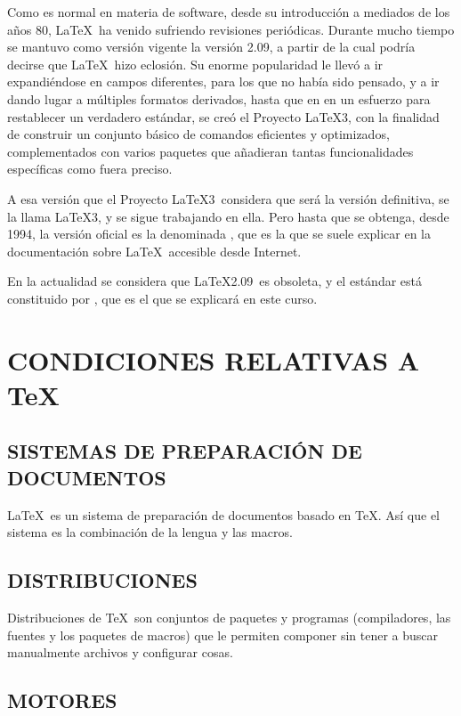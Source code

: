 		Como es normal en materia de software, desde su introducción a mediados de los años 80, \LaTeX\ ha venido sufriendo revisiones periódicas. Durante mucho tiempo se mantuvo como versión vigente la versión 2.09, a partir de la cual podría decirse que \LaTeX\ hizo eclosión. Su enorme popularidad le llevó a ir expandiéndose en campos diferentes, para los que no había sido pensado, y a ir dando lugar a múltiples formatos derivados, hasta que en en un esfuerzo para restablecer un verdadero estándar, se creó el Proyecto \LaTeX3, con la finalidad de construir un conjunto básico de comandos eficientes y optimizados, complementados con varios paquetes que añadieran tantas funcionalidades específicas como fuera preciso.
		
		A esa versión que el Proyecto \LaTeX3\ considera que será la versión definitiva, se la llama \LaTeX 3, y se sigue trabajando en ella. Pero hasta que se obtenga, desde 1994, la versión oficial es la denominada \LaTeXe, que es la que se suele explicar en la documentación sobre \LaTeX\ accesible desde Internet.
		
		En la actualidad se considera que \LaTeX 2.09\ es obsoleta, y el estándar está constituido por \LaTeXe, que es el que se explicará en este curso.
		
	\section*{CONDICIONES RELATIVAS A \TeX}
		
		\subsection*{SISTEMAS DE PREPARACIÓN DE DOCUMENTOS}
		
		\LaTeX\ es un sistema de preparación de documentos basado en TeX. Así que el sistema es la combinación de la lengua y las macros.
		
		\subsection*{DISTRIBUCIONES}
		
		Distribuciones de \TeX\ son conjuntos de paquetes y programas (compiladores, las fuentes y los paquetes de macros) que le permiten componer sin tener a buscar manualmente archivos y configurar cosas.
		
		\subsection*{MOTORES}
		
